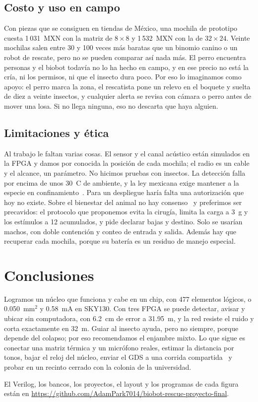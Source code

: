 \documentclass[conference,letterpaper,10pt]{IEEEtran}
\begin{document}
\subsection{Costo y uso en campo}

Con piezas que se consiguen en tiendas de México, una mochila de prototipo cuesta 1\,031~MXN con la matriz de $8\times8$ y 1\,532~MXN con la
de $32\times24$. Veinte mochilas salen entre 30 y 100 veces más baratas que un binomio canino o un robot de rescate, pero no se pueden comparar así nada
más. El perro encuentra personas y el biobot todavía no lo ha hecho en campo, y en ese precio no está la cría, ni los permisos, ni que el
insecto dura poco. Por eso lo imaginamos como apoyo: el perro marca la zona, el rescatista pone un relevo en el boquete y suelta de diez a
veinte insectos, y cualquier alerta se revisa con cámara o perro antes de mover una losa. Si no llega ninguna, eso no descarta que haya
alguien.

\subsection{Limitaciones y ética}

Al trabajo le faltan varias cosas. El sensor y el canal acústico están simulados en la FPGA y damos por conocida la posición de cada
mochila; el radio es un cable y el alcance, un parámetro. No hicimos pruebas con insectos. La detección falla por encima de unos
30~\textdegree C de ambiente, y la ley mexicana exige mantener a la especie en confinamiento~\cite{lgvs}. Para un despliegue haría falta una autorización que hoy no
existe. Sobre el bienestar del animal no hay consenso~\cite{gibbons2022,adamo2016} y preferimos ser precavidos:
el protocolo que proponemos evita la cirugía, limita la carga a 3~g y los estímulos a 12 acumulados, y pide declarar bajas y destino. Solo se
usarían machos, con doble contención y conteo de entrada y salida. Además hay que recuperar cada mochila, porque su batería es un residuo de
manejo especial.

\section{Conclusiones}

Logramos un núcleo que funciona y cabe en un chip, con 477 elementos lógicos, o 0.050~mm$^2$ y 0.58~mA en SKY130. Con tres FPGA se puede
detectar, avisar y ubicar sin computadora, con 6.2~cm de error a 31.95~m, y la red resiste el ruido y corta exactamente en 32~m. Guiar al
insecto ayuda, pero no siempre, porque depende del colapso; por eso recomendamos el enjambre mixto. Lo que sigue es conectar una matriz
térmica y un micrófono reales, estimar la distancia por tonos, bajar el reloj del núcleo, enviar el GDS a una corrida
compartida~\cite{tinytapeout} y probar en un recinto cerrado con la colonia de la universidad.

El Verilog, los bancos, los proyectos, el layout y los programas de cada figura están en
\url{https://github.com/AdamPark7014/biobot-rescue-proyecto-final}.

\FloatBarrier
\balance

\end{document}
